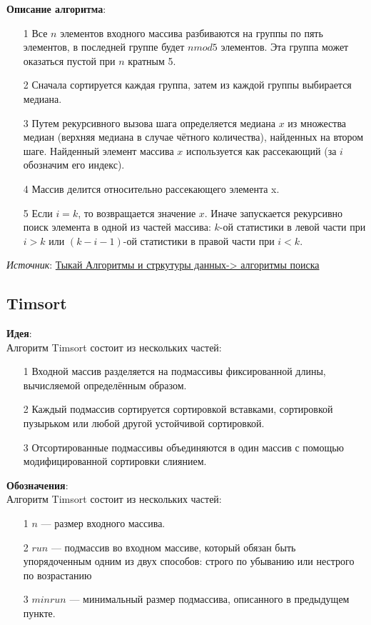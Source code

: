 \noindent\textbf{Описание алгоритма}:\\
\begin{itemize}
    \item[1] Все $n$ элементов входного массива разбиваются на группы по пять элементов, в последней группе будет $n mod 5$ элементов. Эта группа может оказаться пустой при $n$ кратным 5.
    \item[2] Сначала сортируется каждая группа, затем из каждой группы выбирается медиана.
	\item[3] Путем рекурсивного вызова шага определяется медиана $x$ из множества медиан (верхняя медиана в случае чётного количества), найденных на втором шаге. Найденный элемент массива $x$ используется как рассекающий (за $i$ обозначим его индекс).
	\item[4] Массив делится относительно рассекающего элемента x.
	\item[5] Если $i = k$, то возвращается значение $x$. Иначе запускается рекурсивно поиск элемента в одной из частей массива: $k$-ой статистики в левой части при $i > k$ или $(k - i - 1)$-ой статистики в правой части при $i < k$.
\end{itemize}

\noindent\textit{Источник}: \href{http://neerc.ifmo.ru/wiki}{Тыкай Алгоритмы и стркутуры данных-> алгоритмы поиска}

\subsection{Timsort}
\noindent\textbf{Идея}:\\
Алгоритм Timsort состоит из нескольких частей: 
\begin{itemize}
    \item[1] Входной массив разделяется на подмассивы фиксированной длины, вычисляемой определённым образом.
    \item[2]  Каждый подмассив сортируется сортировкой вставками, сортировкой пузырьком или любой другой устойчивой сортировкой.
	\item[3]  Отсортированные подмассивы объединяются в один массив с помощью модифицированной сортировки слиянием.
\end{itemize}


\noindent\textbf{Обозначения}:\\
Алгоритм Timsort состоит из нескольких частей: 
\begin{itemize}
    \item[1] $n$ — размер входного массива.
    \item[2]  $run$ — подмассив во входном массиве, который обязан быть упорядоченным одним из двух способов: строго по убыванию или нестрого по возрастанию
	\item[3]  $minrun$ — минимальный размер подмассива, описанного в предыдущем пункте.
\end{itemize}


